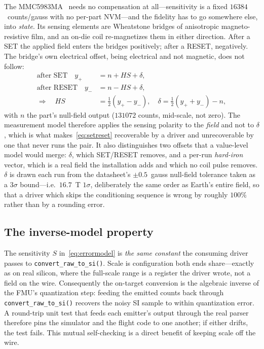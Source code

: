 \documentclass[preprint,12pt,a4paper]{elsarticle}
\newcommand{\code}[1]{\texttt{\small #1}}
\begin{document}
The MMC5983MA~\cite{memsic_mmc5983ma} needs no compensation at
all---sensitivity is a fixed $16384$~counts/gauss with no per-part NVM---and
the fidelity has to go somewhere
else, into \emph{state}. Its sensing elements are Wheatstone bridges of
anisotropic magneto-resistive film, and an on-die coil re-magnetizes them in
either direction. After a SET the applied field enters the bridges positively;
after a RESET, negatively. The bridge's own electrical offset, being electrical
and not magnetic, does not follow:
\begin{align}
\text{after SET}\quad   y_+ &= n + HS + \delta,\nonumber\\
\text{after RESET}\quad y_- &= n - HS + \delta,\label{eq:setreset}\\
\Rightarrow\quad HS &= \tfrac{1}{2}(y_+ - y_-), \quad
\delta = \tfrac{1}{2}(y_+ + y_-) - n,\nonumber
\end{align}
with $n$ the part's null-field output ($131072$ counts, mid-scale, not zero).
The measurement model therefore applies the sensing polarity to the
\emph{field} and not to $\delta$, which is what makes~\eqref{eq:setreset}
recoverable by a driver and unrecoverable by one that never runs the pair. It
also distinguishes two offsets that a value-level model would merge: $\delta$,
which SET/RESET removes, and a per-run \emph{hard-iron} vector, which is a real
field the installation adds and which no coil pulse removes. $\delta$ is drawn
each run from the datasheet's $\pm0.5$~gauss null-field tolerance taken as a
$3\sigma$ bound---i.e.\ $16.7$~\textmu T $1\sigma$, deliberately the same order
as Earth's entire field, so that a driver which skips the conditioning sequence
is wrong by roughly $100\%$ rather than by a rounding error.

\subsection{The inverse-model property}
\label{sec:inverse}
The sensitivity $S$ in~\eqref{eq:errormodel} is \emph{the same constant} the
consuming driver passes to \code{convert\_raw\_to\_si()}. Scale is configuration
both ends share---exactly as on real silicon, where the full-scale range is a
register the driver wrote, not a field on the wire. Consequently the on-target
conversion is the algebraic inverse of the FMU's quantization step: feeding the
emitted counts back through \code{convert\_raw\_to\_si()} recovers the noisy SI
sample to within quantization error. A round-trip unit test that feeds each
emitter's output through the real parser therefore pins the simulator and the
flight code to one another; if either drifts, the test fails. This mutual
self-checking is a direct benefit of keeping scale off the wire.
\end{document}
